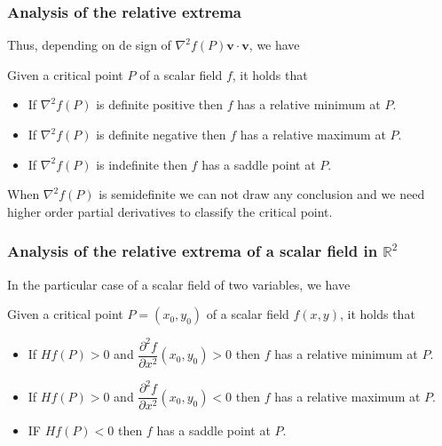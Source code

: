 \begin{frame}
\frametitle{Analysis of the relative extrema}
Thus, depending on de sign of $\nabla^2 f(P)\mathbf{v}\cdot\mathbf{v}$, we have 
\begin{theorem}
Given a critical point $P$ of a scalar field $f$, it holds that
\begin{itemize}
\item If $\nabla^2f(P)$ is definite positive then $f$ has a relative minimum at $P$.
\item If $\nabla^2f(P)$ is definite negative then $f$ has a relative maximum at $P$.
\item If $\nabla^2f(P)$ is indefinite then $f$ has a saddle point at $P$.
\end{itemize}
\end{theorem}
When $\nabla^2f(P)$ is semidefinite we can not draw any conclusion and we need higher order partial derivatives to classify the critical point. 
\end{frame}


\begin{frame}
\frametitle{Analysis of the relative extrema of a scalar field in $\mathbb{R}^2$}
In the particular case of a scalar field of two variables, we have
\begin{theorem}
Given a critical point $P=(x_0,y_0)$ of a scalar field $f(x,y)$, it holds that
\begin{itemize}
\item If $Hf(P)>0$ and $\dfrac{\partial^2 f}{\partial x^2}(x_0,y_0)>0$ then $f$ has a relative minimum at $P$.
\item If $Hf(P)>0$ and $\dfrac{\partial^2 f}{\partial x^2}(x_0,y_0)<0$ then $f$ has a relative maximum at $P$.
\item IF $Hf(P)<0$ then $f$ has a saddle point at $P$.
\end{itemize}
\end{theorem}
\end{frame}


